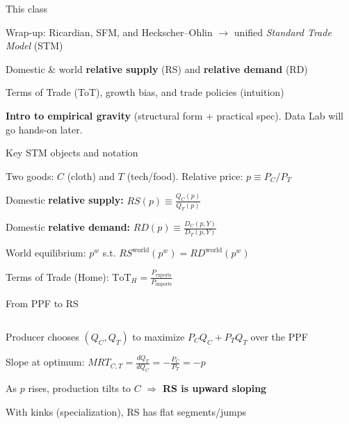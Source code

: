\documentclass[notes,11pt, aspectratio=169, xcolor=table]{beamer}
\newenvironment{wideitemize}{\itemize\addtolength{\itemsep}{10pt}}{\enditemize}
\begin{document}
\begin{frame}{This class}
\begin{wideitemize}
  \item Wrap-up: Ricardian, SFM, and Heckscher–Ohlin $\rightarrow$ unified \emph{Standard Trade Model} (STM)
  \item Domestic \& world \textbf{relative supply} (RS) and \textbf{relative demand} (RD)
  \item Terms of Trade (ToT), growth bias, and trade policies (intuition)
  \item \textbf{Intro to empirical gravity} (structural form + practical spec). Data Lab will go hands-on later.
\end{wideitemize}
\end{frame}


\begin{frame}{Key STM objects and notation}
\begin{wideitemize}
  \item Two goods: $C$ (cloth) and $T$ (tech/food). Relative price: $p \equiv P_C/P_T$
  \item Domestic \textbf{relative supply:} $RS(p) \equiv \frac{Q_C(p)}{Q_T(p)}$
  \item Domestic \textbf{relative demand:} $RD(p) \equiv \frac{D_C(p,Y)}{D_T(p,Y)}$
  \item World equilibrium: $p^{w}$ s.t. $RS^{\text{world}}(p^{w})=RD^{\text{world}}(p^{w})$
  \item Terms of Trade (Home): $\text{ToT}_H = \frac{P_{\text{exports}}}{P_{\text{imports}}}$
\end{wideitemize}
\end{frame}

\begin{frame}{From PPF to RS}
\begin{columns}[T]
\begin{column}{0.58\textwidth}
\begin{wideitemize}
  \item Producer chooses $(Q_C,Q_T)$ to maximize $P_C Q_C + P_T Q_T$ over the PPF
  \item Slope at optimum: $MRT_{C,T} = \frac{dQ_T}{dQ_C} = -\frac{P_C}{P_T}=-p$
  \item As $p$ rises, production tilts to $C$ $\Rightarrow$ \textbf{RS is upward sloping}
  \item With kinks (specialization), RS has flat segments/jumps
\end{wideitemize}
\end{column}
\begin{column}{0.38\textwidth}
\centering
\end{column}
\end{columns}
\end{frame}
\end{document}
